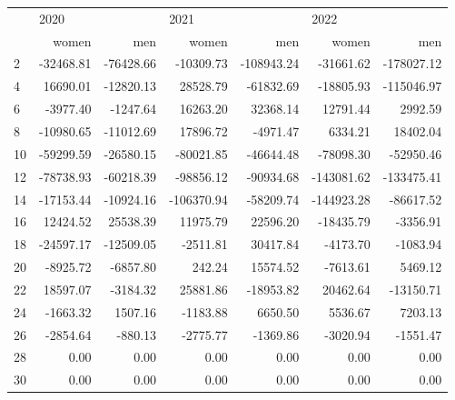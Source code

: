 \begin{tabular}{lrrrrrr}
\toprule
{} & \multicolumn{2}{l}{2020} & \multicolumn{2}{l}{2021} & \multicolumn{2}{l}{2022} \\
{} &     women &       men &      women &        men &      women &        men \\
\midrule
2  & -32468.81 & -76428.66 &  -10309.73 & -108943.24 &  -31661.62 & -178027.12 \\
4  &  16690.01 & -12820.13 &   28528.79 &  -61832.69 &  -18805.93 & -115046.97 \\
6  &  -3977.40 &  -1247.64 &   16263.20 &   32368.14 &   12791.44 &    2992.59 \\
8  & -10980.65 & -11012.69 &   17896.72 &   -4971.47 &    6334.21 &   18402.04 \\
10 & -59299.59 & -26580.15 &  -80021.85 &  -46644.48 &  -78098.30 &  -52950.46 \\
12 & -78738.93 & -60218.39 &  -98856.12 &  -90934.68 & -143081.62 & -133475.41 \\
14 & -17153.44 & -10924.16 & -106370.94 &  -58209.74 & -144923.28 &  -86617.52 \\
16 &  12424.52 &  25538.39 &   11975.79 &   22596.20 &  -18435.79 &   -3356.91 \\
18 & -24597.17 & -12509.05 &   -2511.81 &   30417.84 &   -4173.70 &   -1083.94 \\
20 &  -8925.72 &  -6857.80 &     242.24 &   15574.52 &   -7613.61 &    5469.12 \\
22 &  18597.07 &  -3184.32 &   25881.86 &  -18953.82 &   20462.64 &  -13150.71 \\
24 &  -1663.32 &   1507.16 &   -1183.88 &    6650.50 &    5536.67 &    7203.13 \\
26 &  -2854.64 &   -880.13 &   -2775.77 &   -1369.86 &   -3020.94 &   -1551.47 \\
28 &      0.00 &      0.00 &       0.00 &       0.00 &       0.00 &       0.00 \\
30 &      0.00 &      0.00 &       0.00 &       0.00 &       0.00 &       0.00 \\
\bottomrule
\end{tabular}
